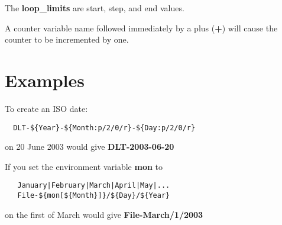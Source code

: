The {\bf loop\_limits} are start, step, and end values.

A counter variable name followed immediately by a plus ({\bf +}) will cause
the counter to be incremented by one.

\section{Examples}

To create an ISO date:

\footnotesize
\begin{verbatim}
  DLT-${Year}-${Month:p/2/0/r}-${Day:p/2/0/r}
\end{verbatim}
\normalsize

on 20 June 2003 would give {\bf DLT-2003-06-20}

If you set the environment variable {\bf mon} to

\footnotesize
\begin{verbatim}
   January|February|March|April|May|...
   File-${mon[${Month}]}/${Day}/${Year}
\end{verbatim}
\normalsize

on the first of March would give {\bf File-March/1/2003 }
